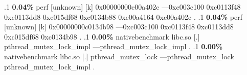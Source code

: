 \begin{profile}
{.1 \textbf{ 0.04\%} perf             [unknown]              [k] 0x00000000c00a402c\newline {} ---0xc003c100\newline {} 0xc0113f48\newline {} 0xc0113dd8\newline {} 0xc015df68\newline {} 0xc0134b88\newline {} 0xc00a4164\newline {} 0xc00a402c\newline {} . 
.1 \textbf{ 0.04\%} perf             [unknown]              [k] 0x00000000c0134b98\newline {} ---0xc003c100\newline {} 0xc0113f48\newline {} 0xc0113dd8\newline {} 0xc015df68\newline {} 0xc0134b98\newline {} . 
.1 \textbf{ 0.00\%} nativebenchmark  libc.so                [.] pthread\_mutex\_lock\_impl\newline {} ---pthread\_mutex\_lock\_impl\newline {} . 
.1 \textbf{ 0.00\%} nativebenchmark  libc.so                [.] pthread\_mutex\_lock\newline {} ---pthread\_mutex\_lock\newline {} pthread\_mutex\_lock\_impl\newline {} . 
}
\end{profile}
